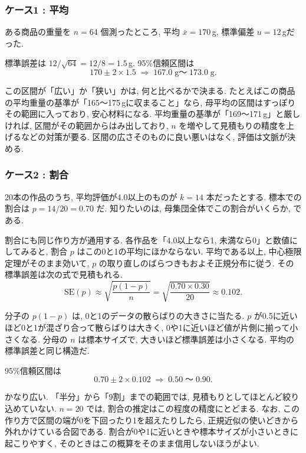     \subsubsection*{ケース1 : 平均}

    ある商品の重量を $n = 64$ 個測ったところ, 平均 $\bar{x} = 170$\,g, 標準偏差 $u = 12$\,gだった.

    標準誤差は $12/\sqrt{64} = 12/8 = 1.5$\,g.
    95\%信頼区間は
    \[
      170 \pm 2 \times 1.5 \;\Rightarrow\; 167.0\;\text{g〜}\;173.0\;\text{g}.
    \]

    この区間が「広い」か「狭い」かは, 何と比べるかで決まる.
    たとえばこの商品の平均重量の基準が「165〜175\,gに収まること」なら, 母平均の区間はすっぽりその範囲に入っており, 安心材料になる.
    平均重量の基準が「169〜171\,g」と厳しければ, 区間がその範囲からはみ出しており, $n$ を増やして見積もりの精度を上げるなどの対策が要る.
    区間の広さそのものに良い悪いはなく, 評価は文脈が決める.

    \subsubsection*{ケース2 : 割合}

    20本の作品のうち, 平均評価が4.0以上のものが $k = 14$ 本だったとする.
    標本での割合は $p = 14/20 = 0.70$ だ.
    知りたいのは, 母集団全体でこの割合がいくらか, である.

    割合にも同じ作り方が通用する.
    各作品を「4.0以上なら1, 未満なら0」と数値にしてみると, 割合 $p$ はこの0と1の平均にほかならない.
    平均である以上, 中心極限定理がそのまま効いて, $p$ の取り直しのばらつきもおよそ正規分布に従う.
    その標準誤差は次の式で見積もれる.
    \[
      \mathrm{SE}(p) \approx \sqrt{\frac{p(1-p)}{n}} = \sqrt{\frac{0.70 \times 0.30}{20}} \approx 0.102.
    \]

    分子の $p(1-p)$ は, 0と1のデータの散らばりの大きさに当たる.
    $p$ が0.5に近いほど0と1が混ざり合って散らばりは大きく, 0や1に近いほど値が片側に揃って小さくなる.
    分母の $n$ は標本サイズで, 大きいほど標準誤差は小さくなる.
    平均の標準誤差と同じ構造だ.

    95\%信頼区間は
    \[
      0.70 \pm 2 \times 0.102 \;\Rightarrow\; 0.50\;\text{〜}\;0.90.
    \]

    かなり広い.
    「半分」から「9割」までの範囲では, 見積もりとしてほとんど絞り込めていない.
    $n = 20$ では, 割合の推定はこの程度の精度にとどまる.
    なお, この作り方で区間の端が0を下回ったり1を超えたりしたら, 正規近似の使いどきから外れかけている合図である.
    割合が0や1に近いときや標本サイズが小さいときに起こりやすく, そのときはこの概算をそのまま信用しないほうがよい.


